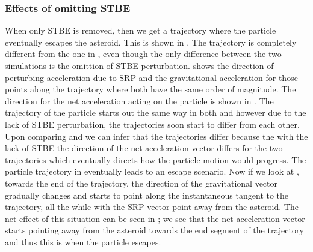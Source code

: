 \subsubsection{Effects of omitting \gls{STBE}}
When only \gls{STBE} is removed, then we get a trajectory where the particle eventually escapes the asteroid. This is shown in . The trajectory is completely different from the one in , even though the only difference between the two simulations is the omittion of \gls{STBE} perturbation.  shows the direction of perturbing acceleration due to \gls{SRP} and the gravitational acceleration for those points along the trajectory where both have the same order of magnitude. The direction for the net acceleration acting on the particle is shown in . The trajectory of the particle starts out the same way in both  and  however due to the lack of \gls{STBE} perturbation, the trajectories soon start to differ from each other. Upon comparing  and  we can infer that the trajectories differ because the with the lack of \gls{STBE} the direction of the net acceleration vector differs for the two trajectories which eventually directs how the particle motion would progress. The particle trajectory in  eventually leads to an escape scenario. Now if we look at , towards the end of the trajectory, the direction of the gravitational vector gradually changes and starts to point along the instantaneous tangent to the trajectory, all the while with the \gls{SRP} vector point away from the asteroid. The net effect of this situation can be seen in ; we see that the net acceleration vector starts pointing away from the asteroid towards the end segment of the trajectory and thus this is when the particle escapes.

